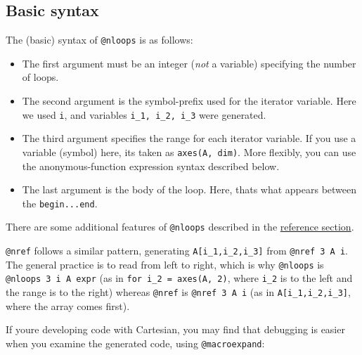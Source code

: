 \hypertarget{14286156567823237502}{}


\subsection{Basic syntax}



The (basic) syntax of \texttt{@nloops} is as follows:



\begin{itemize}
\item The first argument must be an integer (\emph{not} a variable) specifying the number of loops.


\item The second argument is the symbol-prefix used for the iterator variable. Here we used \texttt{i}, and variables \texttt{i\_1, i\_2, i\_3} were generated.


\item The third argument specifies the range for each iterator variable. If you use a variable (symbol) here, it{\textquotesingle}s taken as \texttt{axes(A, dim)}. More flexibly, you can use the anonymous-function expression syntax described below.


\item The last argument is the body of the loop. Here, that{\textquotesingle}s what appears between the \texttt{begin...end}.

\end{itemize}


There are some additional features of \texttt{@nloops} described in the \hyperlink{6401299442402093832}{reference section}.



\texttt{@nref} follows a similar pattern, generating \texttt{A[i\_1,i\_2,i\_3]} from \texttt{@nref 3 A i}. The general practice is to read from left to right, which is why \texttt{@nloops} is \texttt{@nloops 3 i A expr} (as in \texttt{for i\_2 = axes(A, 2)}, where \texttt{i\_2} is to the left and the range is to the right) whereas \texttt{@nref} is \texttt{@nref 3 A i} (as in \texttt{A[i\_1,i\_2,i\_3]}, where the array comes first).



If you{\textquotesingle}re developing code with Cartesian, you may find that debugging is easier when you examine the generated code, using \texttt{@macroexpand}:






